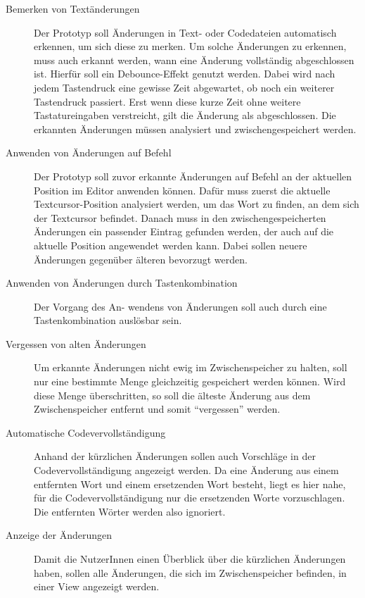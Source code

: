 \begin{description}
    \item[Bemerken von Textänderungen] 
    Der Prototyp soll Änderungen in Text- oder Codedateien automatisch
    erkennen, um sich diese zu merken. Um solche Änderungen
    zu erkennen, muss auch erkannt werden, wann eine Änderung 
    vollständig abgeschlossen ist. Hierfür
    soll ein Debounce-Effekt genutzt werden. 
    Dabei wird nach jedem Tastendruck eine gewisse Zeit abgewartet,
    ob noch ein weiterer Tastendruck passiert. Erst wenn
    diese kurze Zeit ohne weitere Tastatureingaben verstreicht, gilt
    die Änderung als abgeschlossen.
    Die erkannten Änderungen müssen analysiert 
    und zwischengespeichert werden.

    \item[Anwenden von Änderungen auf Befehl] 
    Der Prototyp soll zuvor erkannte Änderungen auf Befehl an der
    aktuellen Position im Editor anwenden können. Dafür muss zuerst die
    aktuelle Textcursor-Position analysiert werden, um das Wort zu finden,
    an dem sich der Textcursor befindet. Danach muss in den 
    zwischengespeicherten Änderungen ein passender Eintrag gefunden werden,
    der auch auf die aktuelle Position angewendet werden kann.
    Dabei sollen neuere Änderungen gegenüber älteren bevorzugt werden.

    \item[Anwenden von Änderungen durch Tastenkombination]
    Der Vorgang des An-\linebreak
    wendens von Änderungen soll auch durch eine
    Tastenkombination auslösbar sein.

    \item[Vergessen von alten Änderungen]
    Um erkannte Änderungen nicht ewig im Zwischenspeicher zu halten,
    soll nur eine bestimmte Menge gleichzeitig gespeichert werden 
    können. Wird diese Menge überschritten, so soll die älteste Änderung
    aus dem Zwischenspeicher entfernt und somit \enquote{vergessen} werden.

    \item[Automatische Codevervollständigung]
    Anhand der kürzlichen Änderungen sollen auch Vorschläge
    in der Codevervollständigung angezeigt werden. 
    Da eine Änderung aus einem entfernten Wort 
    und einem ersetzenden Wort besteht, liegt es hier nahe,
    für die Codevervollständigung nur die ersetzenden Worte
    vorzuschlagen. Die entfernten Wörter werden also ignoriert.

    \item[Anzeige der Änderungen]
    Damit die NutzerInnen einen Überblick über die kürzlichen Änderungen
    haben, sollen alle Änderungen, die sich im Zwischenspeicher befinden,
    in einer View angezeigt werden.


\end{description}
